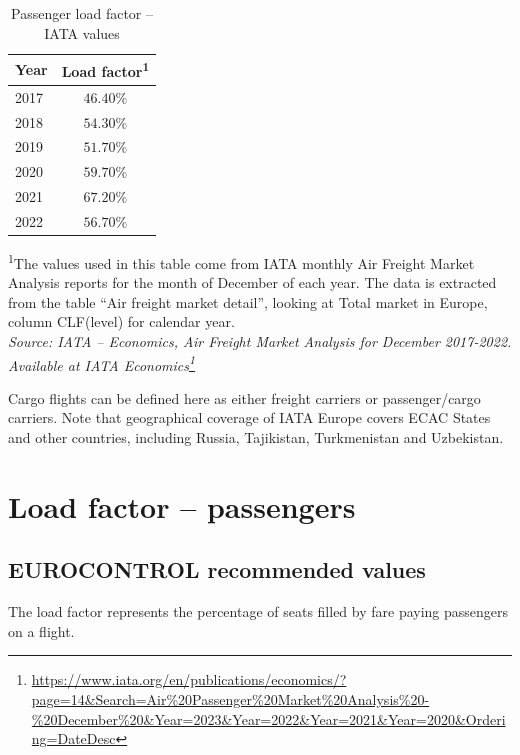 \documentclass[
  11pt,
  a4paper,
]{book}
\DeclareRobustCommand{\href}[2]{#2\footnote{\url{#1}}}
\begin{document}
\hypertarget{tbl-load-pax-iata}{}
\setlength{\LTpost}{0mm}
\begin{longtable}{lc}
\caption{\label{tbl-load-pax-iata}Passenger load factor -- IATA values }\tabularnewline

\toprule
Year & Load factor\textsuperscript{1} \\ 
\midrule
2017 & $46.40\%$ \\ 
2018 & $54.30\%$ \\ 
2019 & $51.70\%$ \\ 
2020 & $59.70\%$ \\ 
2021 & $67.20\%$ \\ 
2022 & $56.70\%$ \\ 
\bottomrule
\end{longtable}
\begin{minipage}{\linewidth}
\textsuperscript{1}The values used in this table come from IATA monthly Air Freight Market Analysis reports for the month of December of each year. The data is extracted from the table “Air freight market detail”, looking at Total market in Europe, column CLF(level) for calendar year.\\
\emph{Source: IATA -- Economics, Air Freight Market Analysis for December 2017-2022. Available at \href{https://www.iata.org/en/publications/economics/?page=14\&Search=Air\%20Passenger\%20Market\%20Analysis\%20-\%20December\%20\&Year=2023\&Year=2022\&Year=2021\&Year=2020\&Ordering=DateDesc}{IATA Economics}}\\
\end{minipage}

Cargo flights can be defined here as either freight carriers or
passenger/cargo carriers. Note that geographical coverage of IATA Europe
covers ECAC States and other countries, including Russia, Tajikistan,
Turkmenistan and Uzbekistan.

\hypertarget{sec-load-factor-passengers}{%
\chapter{Load factor -- passengers}\label{sec-load-factor-passengers}}

\hypertarget{eurocontrol-recommended-values-20}{%
\section{EUROCONTROL recommended
values}\label{eurocontrol-recommended-values-20}}

The load factor represents the percentage of seats filled by fare paying
passengers on a flight.
\end{document}
